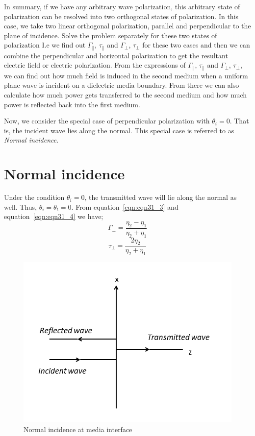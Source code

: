 In summary, if we have any arbitrary wave polarization, this arbitrary state of polarization can be resolved into two orthogonal states of polarization. In this case, we take two linear orthogonal polarization, parallel and perpendicular to the plane of incidence. Solve the problem separately for these two states of polarization I.e we find out $\Gamma_{\parallel}$,  $\tau_{\parallel}$ and $\Gamma_{\perp}$, $\tau_{\perp}$ for these two cases and then we can combine the perpendicular and horizontal polarization to get the resultant electric field or electric polarization. From the expressions of $\Gamma_{\parallel}$,  $\tau_{\parallel}$ and $\Gamma_{\bot}$, $\tau_{\bot}$, we can find out how much field is induced in the second medium when a uniform plane wave is incident on a dielectric media boundary. From there we can also calculate how much power gets transferred to the second medium and how much power is reflected back into the first medium.

Now, we consider the special case of perpendicular polarization with  $\theta_{i} = 0$. That is, the incident wave lies along the normal. This special case is referred to as \emph{Normal incidence}.

\section{Normal incidence} 

Under the condition $\theta_{i} = 0$, the transmitted wave will lie along the normal as well. Thus,  $\theta_{i} = \theta_{t} = 0$. From equation~\ref{eqn:eqn31_3} and equation~\ref{eqn:eqn31_4} we have;
\begin{equation}
\Gamma_{\perp} = \frac{\eta_{2} - \eta_{1}}{\eta_{2} + \eta_{1}}
\end{equation}
\begin{equation}
\tau_{\perp} = \frac{2 \eta_{2}}{\eta_{2} + \eta_{1}}
\end{equation}

\begin{figure}[h]
\centering
\includegraphics[scale=0.6]{./graphics/normal_incidence1}
\caption{Normal incidence at media interface}
\label{fig:16}
\end{figure}

